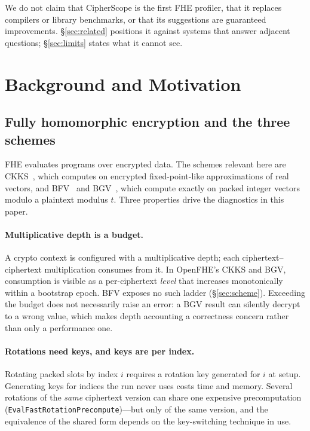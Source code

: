 \documentclass[sigconf,nonacm]{acmart}
\begin{document}
We do not claim that CipherScope is the first FHE profiler, that it replaces
compilers or library benchmarks, or that its suggestions are guaranteed
improvements. \S\ref{sec:related} positions it against systems that answer
adjacent questions; \S\ref{sec:limits} states what it cannot see.

\section{Background and Motivation}
\label{sec:background}

\subsection{Fully homomorphic encryption and the three schemes}

FHE evaluates programs over encrypted data. The schemes relevant here are
CKKS~\cite{ckks2017}, which computes on encrypted fixed-point-like
approximations of real vectors, and BFV~\cite{brakerski2012,fv2012} and
BGV~\cite{bgv2012}, which compute exactly on packed integer vectors modulo a
plaintext modulus $t$. Three properties drive the diagnostics in this paper.

\paragraph{Multiplicative depth is a budget.} A crypto context is configured
with a multiplicative depth; each ciphertext--ciphertext multiplication
consumes from it. In OpenFHE's CKKS and BGV, consumption is visible as a
per-ciphertext \emph{level} that increases monotonically within a bootstrap
epoch. BFV exposes no such ladder (\S\ref{sec:scheme}). Exceeding the budget
does not necessarily raise an error: a BGV result can silently decrypt to a
wrong value, which makes depth accounting a correctness concern rather than
only a performance one.

\paragraph{Rotations need keys, and keys are per index.} Rotating packed
slots by index $i$ requires a rotation key generated for $i$ at setup.
Generating keys for indices the run never uses costs time and memory. Several
rotations of the \emph{same} ciphertext version can share one expensive
precomputation (\texttt{EvalFastRotationPrecompute})---but only of the same
version, and the equivalence of the shared form depends on the key-switching
technique in use.
\end{document}
